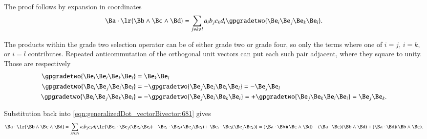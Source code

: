%
%



The proof follows by expansion in coordinates
\begin{dmath}\label{eqn:vectorTrivectorDot:40}
\Ba \cdot \lr{ \Bb \wedge \Bc \wedge \Bd}
= \sum_{j \ne k \ne l} a_i b_j c_k d_l
\gpgradetwo{ \Be_i \Be_j \Be_k \Be_l }.
\end{dmath}

The products within the grade two selection operator can be of either grade two or grade four, so only the terms where one of
\( i = j \), \( i = k \), or \( i = l \) contributes.
Repeated anticommutation of the orthogonal unit vectors can put each such pair adjacent, where they square to unity.
Those are respectively
\begin{dmath}\label{eqn:vectorTrivectorDot:60}
\begin{aligned}
\gpgradetwo{ \Be_i \Be_i \Be_k \Be_l } &= \Be_k \Be_l  \\
\gpgradetwo{ \Be_i \Be_j \Be_i \Be_l } &= -\gpgradetwo{ \Be_j \Be_i \Be_i \Be_l } = - \Be_j \Be_l \\
\gpgradetwo{ \Be_i \Be_j \Be_k \Be_i } &= -\gpgradetwo{ \Be_j \Be_i \Be_k \Be_i } = +\gpgradetwo{ \Be_j \Be_k \Be_i \Be_i } = \Be_j \Be_k.
\end{aligned}
\end{dmath}

Substitution back into \cref{eqn:generalizedDot_vectorBivector:681} gives
\begin{dmath}\label{eqn:vectorTrivectorDot:80}
\Ba \cdot \lr{ \Bb \wedge \Bc \wedge \Bd}
= \sum_{j \ne k \ne l} a_i b_j c_k d_l
\lr{
\Be_i \cdot \Be_j (\Be_k \Be_l)
-
\Be_i \cdot \Be_k (\Be_j \Be_l)
+
\Be_i \cdot \Be_l (\Be_j \Be_k)
}
=
( \Ba \cdot \Bb ) (\Bc \wedge \Bd)
-( \Ba \cdot \Bc ) (\Bb \wedge \Bd)
+( \Ba \cdot \Bd ) (\Bb \wedge \Bc).
\end{dmath}

